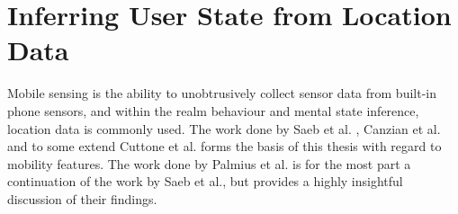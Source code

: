 \section{Inferring User State from Location Data}





Mobile sensing is the ability to unobtrusively collect sensor data from built-in phone sensors, and within the realm behaviour and mental state inference, location data is commonly used. The work done by Saeb et al. \cite{Saeb2015}, Canzian et al. \cite{Canzian2015}  and to some extend Cuttone et al. \cite{sparse-location-2014} forms the basis of this thesis with regard to mobility features. The work done by Palmius et al. \cite{palmius2017} is for the most part a continuation of the work by Saeb et al., but provides a highly insightful discussion of their findings.

